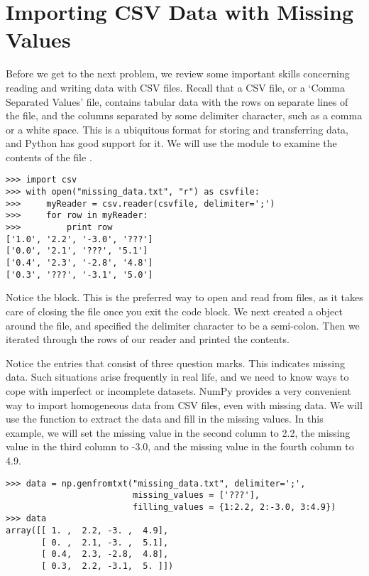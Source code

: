 \section*{Importing CSV Data with Missing Values}
Before we get to the next problem, we review some important skills concerning reading and writing data with CSV files. 
Recall that a CSV file, or a `Comma Separated Values' file, contains tabular data with the rows on separate lines
of the file, and the columns separated by some delimiter character, such as a comma or a white space. This is a 
ubiquitous format for storing and transferring data, and Python has good support for it. We will use the 
module to examine the contents of the file .

\begin{lstlisting}
>>> import csv
>>> with open("missing_data.txt", "r") as csvfile:
>>>     myReader = csv.reader(csvfile, delimiter=';')
>>>     for row in myReader:
>>>         print row
['1.0', '2.2', '-3.0', '???']
['0.0', '2.1', '???', '5.1']
['0.4', '2.3', '-2.8', '4.8']
['0.3', '???', '-3.1', '5.0']
\end{lstlisting}

Notice the  block. This is the preferred way to open and read from files, as it takes care of 
closing the file once you exit the code block. We next created a  object around 
the file, and specified the delimiter character to be a semi-colon. Then we iterated through the rows of our reader
and printed the contents.

Notice the entries that consist of three question marks. This indicates missing data. Such situations arise frequently
in real life, and we need to know ways to cope with imperfect or incomplete datasets. NumPy provides a very convenient
way to import homogeneous data from CSV files, even with missing data. We will use the  function to
extract the data and fill in the missing values. In this example, we will set the missing value in the second column to
2.2, the missing value in the third column to -3.0, and the missing value in the fourth column to 4.9.

\begin{lstlisting}
>>> data = np.genfromtxt("missing_data.txt", delimiter=';',
                         missing_values = ['???'],
                         filling_values = {1:2.2, 2:-3.0, 3:4.9})
>>> data
array([[ 1. ,  2.2, -3. ,  4.9],
       [ 0. ,  2.1, -3. ,  5.1],
       [ 0.4,  2.3, -2.8,  4.8],
       [ 0.3,  2.2, -3.1,  5. ]])
\end{lstlisting}


